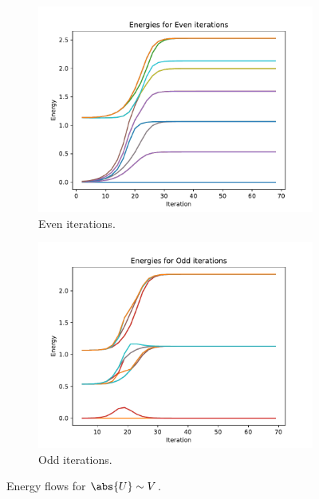 \begin{figure}
  \centering
  \begin{subfigure}[b]{0.4\linewidth}
    \centering
    \includegraphics[width=\linewidth]{./gfx/results/even_lowU.pdf}
    \caption{Even iterations.}
    \label{fig:5-results-energies-lowu-a}
  \end{subfigure}
  \begin{subfigure}[b]{0.4\linewidth}
    \centering
    \includegraphics[width=\linewidth]{./gfx/results/odd_lowU.pdf}
    \caption{Odd iterations.}
    \label{fig:5-results-energies-lowu-b}
  \end{subfigure}
  \caption{Energy flows for $\abs{U} \sim V$.}
\end{figure}

